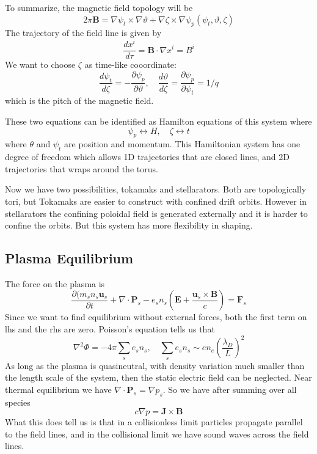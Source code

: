 \documentclass[letterpaper, 11pt]{article}
\numberwithin{equation}{section}
\numberwithin{figure}{section}
\begin{document}
To summarize, the magnetic field topology will be
\begin{equation}
  \label{eq:8}
  2\pi \mathbf{B} = \nabla \psi_t \times \nabla \vartheta + \nabla\zeta\times\nabla\psi_p(\psi_t, \vartheta, \zeta)
\end{equation}
The trajectory of the field line is given by
\begin{equation}
  \label{eq:9}
\frac{dx^i}{d\tau} = \mathbf{B}\cdot\nabla x^i = B^i
\end{equation}
We want to choose $\zeta$ as time-like cooordinate:
\begin{equation}
  \label{eq:10}
  \frac{d\psi_t}{d\zeta} = -\frac{\partial\psi_p}{\partial\vartheta},\quad \frac{d\vartheta}{d\zeta} = \frac{\partial\psi_p}{\partial\psi_t} = 1/q
\end{equation}
which is the pitch of the magnetic field.

These two equations can be identified as Hamilton equations of this system where
\begin{equation}
  \label{eq:11}
  \psi_p \leftrightarrow H,\quad \zeta\leftrightarrow t
\end{equation}
where $\theta$ and $\psi_t$ are position and momentum. This Hamiltonian system
has one degree of freedom which allows 1D trajectories that are closed lines,
and 2D trajectories that wraps around the torus.

Now we have two possibilities, tokamaks and stellarators. Both are topologically
tori, but Tokamaks are easier to construct with confined drift orbits. However
in stellarators the confining poloidal field is generated externally and it is
harder to confine the orbits. But this system has more flexibility in shaping.

\subsection{Plasma Equilibrium}

The force on the plasma is
\begin{equation}
  \label{eq:12}
  \frac{\partial (m_sn_s\mathbf{u}_s}{\partial t} + \nabla\cdot \mathbf{P}_{s} - e_sn_s \left( \mathbf{E} + \frac{\mathbf{u}_s\times \mathbf{B}}{c} \right) = \mathbf{F}_s
\end{equation}
Since we want to find equilibrium without external forces, both the first term
on lhs and the rhs are zero. Poisson's equation tells us that
\begin{equation}
  \label{eq:13}
  \nabla^2\Phi = -4\pi\sum_se_sn_s,\quad \sum_se_sn_s\sim en_{e}\left( \frac{\lambda_D}{L} \right)^2
\end{equation}
As long as the plasma is quasineutral, with density variation much smaller than
the length scale of the system, then the static electric field can be neglected.
Near thermal equilibrium we have $\nabla\cdot \mathbf{P}_s = \nabla p_s$. So we
have after summing over all species
\begin{equation}
  \label{eq:14}
  c\nabla p = \mathbf{J}\times \mathbf{B}
\end{equation}
What this does tell us is that in a collisionless limit particles propagate
parallel to the field lines, and in the collisional limit we have sound waves
across the field lines.
\end{document}
